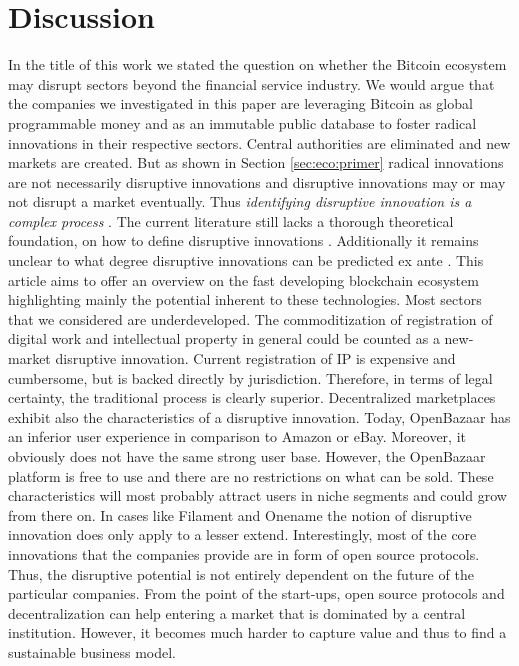 \section{Discussion}
\label{sec:eco:discussion}

In the title of this work we stated the question on whether the Bitcoin ecosystem 
may disrupt sectors beyond the financial service industry. We would argue that 
the companies we investigated in this paper are leveraging Bitcoin as global programmable 
money and as an immutable public database to foster radical innovations in their 
respective sectors. Central authorities are eliminated and new markets are created. 
But as shown in Section \ref{sec:eco:primer} radical innovations are not necessarily disruptive 
innovations and disruptive innovations may or may not disrupt a market eventually. 
Thus \emph{identifying disruptive innovation is a complex process} \parencite{Kaltenecker2015234}. The current literature still lacks a thorough theoretical foundation, 
on how to define disruptive innovations \parencite{ISI:000283729100005}. Additionally it remains 
unclear to what degree disruptive innovations can be predicted ex ante \parencite{JPIM:JPIM179}. This article aims to offer an overview on the fast developing 
blockchain ecosystem highlighting mainly the potential inherent to these technologies. 
Most sectors that we considered are underdeveloped. The commoditization of registration 
of digital work and intellectual property in general could be counted as a new-market 
disruptive innovation. Current registration of IP is expensive and cumbersome, 
but is backed directly by jurisdiction. Therefore, in terms of legal certainty, 
the traditional process is clearly superior. Decentralized marketplaces exhibit 
also the characteristics of a disruptive innovation. Today, OpenBazaar has an inferior 
user experience in comparison to Amazon or eBay. Moreover, it obviously does not 
have the same strong user base. However, the OpenBazaar platform is free to use 
and there are no restrictions on what can be sold. These characteristics will most 
probably attract users in niche segments and could grow from there on. In cases 
like Filament and Onename the notion of disruptive innovation does only apply to 
a lesser extend. Interestingly, most of the core innovations that the companies 
provide are in form of open source protocols. Thus, the disruptive potential is 
not entirely dependent on the future of the particular companies. From the point 
of the start-ups, open source protocols and decentralization can help entering 
a market that is dominated by a central institution. However, it becomes much harder 
to capture value and thus to find a sustainable business model.

